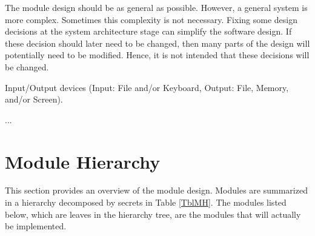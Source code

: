 \documentclass[12pt, titlepage]{article}
\newcounter{ucnum}
\newcommand{\uctheucnum}{UC\theucnum}
\begin{document}
The module design should be as general as possible. However, a general system is
more complex. Sometimes this complexity is not necessary. Fixing some design
decisions at the system architecture stage can simplify the software design. If
these decision should later need to be changed, then many parts of the design
will potentially need to be modified. Hence, it is not intended that these
decisions will be changed.

\begin{description}
\item[ \uctheucnum \label{ucIO}:] Input/Output devices
  (Input: File and/or Keyboard, Output: File, Memory, and/or Screen).
\item ...
\end{description}

\section{Module Hierarchy} \label{SecMH}

This section provides an overview of the module design. Modules are summarized
in a hierarchy decomposed by secrets in Table \ref{TblMH}. The modules listed
below, which are leaves in the hierarchy tree, are the modules that will
actually be implemented.
\end{document}
